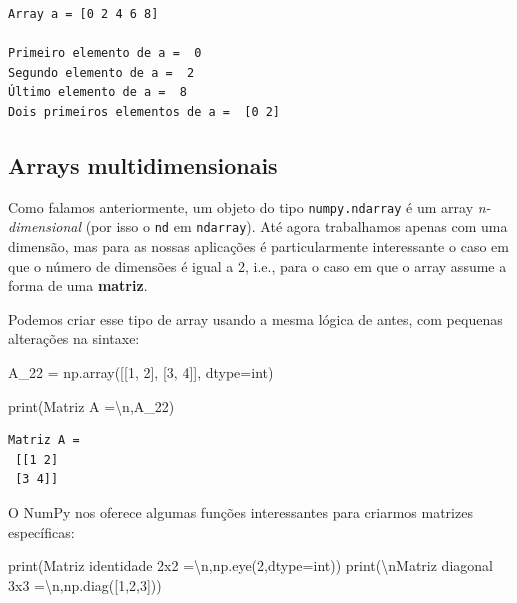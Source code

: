 \documentclass[
  brazilian,
  letterpaper,
  DIV=11,
  numbers=noendperiod]{scrreprt}
\newenvironment{Shaded}{\begin{snugshade}}{\end{snugshade}}
\newcommand{\BuiltInTok}[1]{\textcolor[rgb]{0.00,0.23,0.31}{#1}}
\newcommand{\CharTok}[1]{\textcolor[rgb]{0.13,0.47,0.30}{#1}}
\newcommand{\DecValTok}[1]{\textcolor[rgb]{0.68,0.00,0.00}{#1}}
\newcommand{\NormalTok}[1]{\textcolor[rgb]{0.00,0.23,0.31}{#1}}
\newcommand{\OperatorTok}[1]{\textcolor[rgb]{0.37,0.37,0.37}{#1}}
\newcommand{\StringTok}[1]{\textcolor[rgb]{0.13,0.47,0.30}{#1}}
\begin{document}
\begin{verbatim}
Array a = [0 2 4 6 8]

Primeiro elemento de a =  0
Segundo elemento de a =  2
Último elemento de a =  8
Dois primeiros elementos de a =  [0 2]
\end{verbatim}

\subsection{Arrays multidimensionais}\label{arrays-multidimensionais}

Como falamos anteriormente, um objeto do tipo \texttt{numpy.ndarray} é
um array \emph{n-dimensional} (por isso o \texttt{nd} em
\texttt{ndarray}). Até agora trabalhamos apenas com uma dimensão, mas
para as nossas aplicações é particularmente interessante o caso em que o
número de dimensões é igual a 2, i.e., para o caso em que o array assume
a forma de uma \textbf{matriz}.

Podemos criar esse tipo de array usando a mesma lógica de antes, com
pequenas alterações na sintaxe:

\begin{Shaded}
\begin{Highlighting}[]
\NormalTok{A\_22 }\OperatorTok{=}\NormalTok{ np.array([[}\DecValTok{1}\NormalTok{, }\DecValTok{2}\NormalTok{], [}\DecValTok{3}\NormalTok{, }\DecValTok{4}\NormalTok{]], dtype}\OperatorTok{=}\BuiltInTok{int}\NormalTok{)}

\BuiltInTok{print}\NormalTok{(}\StringTok{\textquotesingle{}Matriz A =}\CharTok{\textbackslash{}n}\StringTok{\textquotesingle{}}\NormalTok{,A\_22)}
\end{Highlighting}
\end{Shaded}

\begin{verbatim}
Matriz A =
 [[1 2]
 [3 4]]
\end{verbatim}

O NumPy nos oferece algumas funções interessantes para criarmos matrizes
específicas:

\begin{Shaded}
\begin{Highlighting}[]
\BuiltInTok{print}\NormalTok{(}\StringTok{\textquotesingle{}Matriz identidade 2x2 =}\CharTok{\textbackslash{}n}\StringTok{\textquotesingle{}}\NormalTok{,np.eye(}\DecValTok{2}\NormalTok{,dtype}\OperatorTok{=}\BuiltInTok{int}\NormalTok{))}
\BuiltInTok{print}\NormalTok{(}\StringTok{\textquotesingle{}}\CharTok{\textbackslash{}n}\StringTok{Matriz diagonal 3x3 =}\CharTok{\textbackslash{}n}\StringTok{\textquotesingle{}}\NormalTok{,np.diag([}\DecValTok{1}\NormalTok{,}\DecValTok{2}\NormalTok{,}\DecValTok{3}\NormalTok{]))}
\end{Highlighting}
\end{Shaded}
\end{document}
